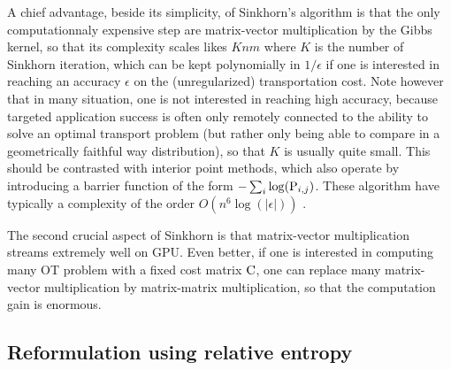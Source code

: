 %

A chief advantage, beside its simplicity, of Sinkhorn's algorithm is that the only computationnaly expensive step are matrix-vector multiplication by the Gibbs kernel, so that its complexity scales likes $Knm$ where $K$ is the number of Sinkhorn iteration, which can be kept polynomially in $1/\epsilon$ if one is interested in reaching an accuracy $\epsilon$ on the (unregularized) transportation cost. Note however that in many situation, one is not interested in reaching high accuracy, because targeted application success is often only remotely connected to the ability to solve an optimal transport problem (but rather only being able to compare in a geometrically faithful way distribution), so that $K$ is usually quite small.
%
This should be contrasted with interior point methods, which also operate by introducing a barrier function of the form $-\sum_i \log(\P_{i,j})$. These algorithm have typically a complexity of the order $O(n^6 \log(|\epsilon|))$ . 

The second crucial aspect of Sinkhorn is that matrix-vector multiplication streams extremely well on GPU. Even better, if one is interested in computing many OT problem with a fixed cost matrix $\C$, one can replace many matrix-vector multiplication by matrix-matrix multiplication, so that the computation gain is enormous. 



\subsection{Reformulation using relative entropy}

